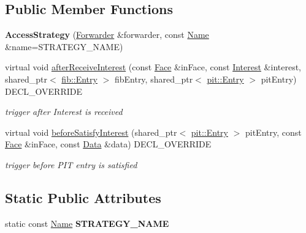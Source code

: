 \subsection*{Public Member Functions}
\begin{DoxyCompactItemize}
\item 
{\bfseries Access\+Strategy} (\hyperlink{classnfd_1_1Forwarder}{Forwarder} \&forwarder, const \hyperlink{classndn_1_1Name}{Name} \&name=S\+T\+R\+A\+T\+E\+G\+Y\+\_\+\+N\+A\+ME)\hypertarget{classnfd_1_1fw_1_1AccessStrategy_a11cfe59d9368cce464fa9690a20db74e}{}\label{classnfd_1_1fw_1_1AccessStrategy_a11cfe59d9368cce464fa9690a20db74e}

\item 
virtual void \hyperlink{classnfd_1_1fw_1_1AccessStrategy_a0ca5163bd045d0c015255c8c97849144}{after\+Receive\+Interest} (const \hyperlink{classnfd_1_1Face}{Face} \&in\+Face, const \hyperlink{classndn_1_1Interest}{Interest} \&interest, shared\+\_\+ptr$<$ \hyperlink{classnfd_1_1fib_1_1Entry}{fib\+::\+Entry} $>$ fib\+Entry, shared\+\_\+ptr$<$ \hyperlink{classnfd_1_1pit_1_1Entry}{pit\+::\+Entry} $>$ pit\+Entry) D\+E\+C\+L\+\_\+\+O\+V\+E\+R\+R\+I\+DE
\begin{DoxyCompactList}\small\item\em trigger after Interest is received \end{DoxyCompactList}\item 
virtual void \hyperlink{classnfd_1_1fw_1_1AccessStrategy_acdab9eb193957a96b486dc515beba8bc}{before\+Satisfy\+Interest} (shared\+\_\+ptr$<$ \hyperlink{classnfd_1_1pit_1_1Entry}{pit\+::\+Entry} $>$ pit\+Entry, const \hyperlink{classnfd_1_1Face}{Face} \&in\+Face, const \hyperlink{classndn_1_1Data}{Data} \&data) D\+E\+C\+L\+\_\+\+O\+V\+E\+R\+R\+I\+DE
\begin{DoxyCompactList}\small\item\em trigger before P\+IT entry is satisfied \end{DoxyCompactList}\end{DoxyCompactItemize}
\subsection*{Static Public Attributes}
\begin{DoxyCompactItemize}
\item 
static const \hyperlink{classndn_1_1Name}{Name} {\bfseries S\+T\+R\+A\+T\+E\+G\+Y\+\_\+\+N\+A\+ME}\hypertarget{classnfd_1_1fw_1_1AccessStrategy_a55033ff224f1b9bca7dde91106d1a7a3}{}\label{classnfd_1_1fw_1_1AccessStrategy_a55033ff224f1b9bca7dde91106d1a7a3}

\end{DoxyCompactItemize}
